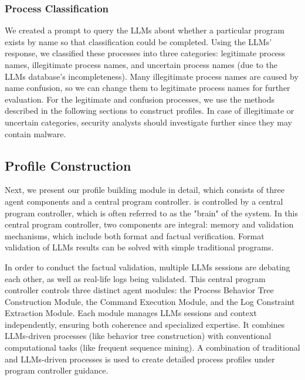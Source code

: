 \subsubsection{Process Classification}
\label{sec:classifition}
We created a prompt to query the LLMs about whether a particular program exists by name so that classification could be completed. Using the LLMs' response, we classified these processes into three categories: legitimate process names, illegitimate process names, 
and uncertain process names (due to the LLMs database's incompleteness). Many illegitimate process names are caused by name confusion, so we can change them to legitimate process names for further evaluation.
For the legitimate and confusion processes, we use the methods described in the following sections to construct profiles. In case of illegitimate or uncertain categories, security analysts should investigate further since they may contain malware.

\subsection{Profile Construction}
\label{sec:profile_con}
Next, we present our profile building module in detail, which consists of three agent components and a central program controller.
\tool is controlled by a central program controller, which is often referred to as the "brain" of the system. In this central program controller, two components are integral: memory and validation mechanisms, which include both format and factual verification. 
Format validation of LLMs results can be solved with simple traditional programs.

In order to conduct the factual validation, multiple LLMs sessions are debating each other, as well as real-life logs being validated.
This central program controller controls three distinct agent modules: the Process Behavior Tree Construction Module, the Command Execution Module, and the Log Constraint Extraction Module. Each module manages LLMs sessions and context independently, ensuring both coherence and specialized expertise. It combines LLMs-driven processes (like behavior tree construction) with conventional computational tasks (like frequent sequence mining). A combination of traditional and LLMs-driven processes is used to create detailed process profiles under program controller guidance.

